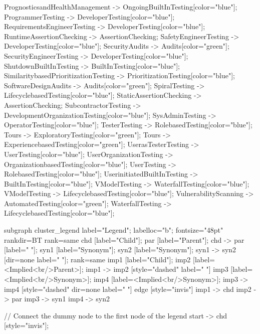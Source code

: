 \documentclass{article}
\begin{document}
{PrognosticsandHealthManagement -> OngoingBuiltInTesting[color="blue"];
ProgrammerTesting -> DeveloperTesting[color="blue"];
RequirementsEngineerTesting -> DeveloperTesting[color="blue"];
RuntimeAssertionChecking -> AssertionChecking;
SafetyEngineerTesting -> DeveloperTesting[color="blue"];
SecurityAudits -> Audits[color="green"];
SecurityEngineerTesting -> DeveloperTesting[color="blue"];
ShutdownBuiltInTesting -> BuiltInTesting[color="blue"];
SimilaritybasedPrioritizationTesting -> PrioritizationTesting[color="blue"];
SoftwareDesignAudits -> Audits[color="green"];
SpiralTesting -> LifecyclebasedTesting[color="blue"];
StaticAssertionChecking -> AssertionChecking;
SubcontractorTesting -> DevelopmentOrganizationTesting[color="blue"];
SysAdminTesting -> OperatorTesting[color="blue"];
TesterTesting -> RolebasedTesting[color="blue"];
Tours -> ExploratoryTesting[color="green"];
Tours -> ExperiencebasedTesting[color="green"];
UserasTesterTesting -> UserTesting[color="blue"];
UserOrganizationTesting -> OrganizationbasedTesting[color="blue"];
UserTesting -> RolebasedTesting[color="blue"];
UserinitiatedBuiltInTesting -> BuiltInTesting[color="blue"];
VModelTesting -> WaterfallTesting[color="blue"];
VModelTesting -> LifecyclebasedTesting[color="blue"];
VulnerabilityScanning -> AutomatedTesting[color="green"];
WaterfallTesting -> LifecyclebasedTesting[color="blue"];

subgraph cluster_legend {
    label="Legend";
    labelloc="b";
    fontsize="48pt"
    rankdir=BT
    {
        rank=same
        chd [label="Child"];
        par [label="Parent"];
        chd -> par [label="                "];
        syn1 [label="Synonym"];
        syn2 [label="Synonym"];
        syn1 -> syn2 [dir=none label="                "];
    }
    {
        rank=same
        imp1 [label="Child"];
        imp2 [label=<Implied<br/>Parent>];
        imp1 -> imp2 [style="dashed" label="                "]
        imp3 [label=<Implied<br/>Synonym>];
        imp4 [label=<Implied<br/>Synonym>];
        imp3 -> imp4 [style="dashed" dir=none label="                "]
    }
    edge [style="invis"]
    imp1 -> chd
    imp2 -> par
    imp3 -> syn1
    imp4 -> syn2
}

// Connect the dummy node to the first node of the legend
start -> chd [style="invis"];
}
\end{document}
